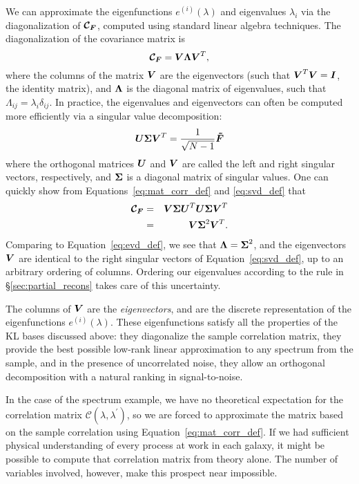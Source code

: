 We can approximate the eigenfunctions $e^{(i)}(\lambda)$ and
eigenvalues $\lambda_i$ via the diagonalization 
of $\boldsymbol{\mathcal{C}_F}$, computed using standard linear algebra techniques.
The diagonalization of the covariance matrix is
\begin{equation}
  \label{eq:evd_def}
  \boldsymbol{\mathcal{C}_F} = \boldsymbol{V}\boldsymbol{\Lambda}\boldsymbol{V}^T,
\end{equation}
where the columns of the matrix $\boldsymbol{V}$ are the eigenvectors
(such that $\boldsymbol{V}^T \boldsymbol{V} = \boldsymbol{I}$, the identity matrix), and
$\boldsymbol{\Lambda}$ is the diagonal matrix of eigenvalues, such that
$\Lambda_{ij} = \lambda_i\delta_{ij}$.  In practice, the eigenvalues and
eigenvectors can often be computed more efficiently via a singular value
decomposition:
\begin{equation}
  \label{eq:svd_def}
  \boldsymbol{U}\boldsymbol{\Sigma}\boldsymbol{V}^T
  = \frac{1}{\sqrt{N - 1}}\boldsymbol{\tilde{F}}
\end{equation}
where the orthogonal matrices $\boldsymbol{U}$ and $\boldsymbol{V}$ are called the
left and
right singular vectors, respectively, and $\boldsymbol{\Sigma}$ is a diagonal matrix
of singular values.  One can quickly show from Equations~\ref{eq:mat_corr_def}
and \ref{eq:svd_def} that
\begin{eqnarray}
  \boldsymbol{\mathcal{C}_F}
  &=& \boldsymbol{V}\boldsymbol{\Sigma}\boldsymbol{U}^T
  \boldsymbol{U}\boldsymbol{\Sigma}\boldsymbol{V}^T\nonumber\\
  &=& \boldsymbol{V}\boldsymbol{\Sigma}^2\boldsymbol{V}^T.
\end{eqnarray}
Comparing to Equation~\ref{eq:evd_def}, we see that 
$\boldsymbol{\Lambda} = \boldsymbol{\Sigma}^2$, and the eigenvectors $\boldsymbol{V}$ are
identical to the right singular vectors of Equation~\ref{eq:svd_def},
up to an arbitrary ordering of columns.  Ordering our eigenvalues
according to the rule in \S\ref{sec:partial_recons} takes care of
this uncertainty.

The columns of $\boldsymbol{V}$ are the {\it eigenvectors}, and are the discrete
representation of the eigenfunctions $e^{(i)}(\lambda)$.  These eigenfunctions
satisfy all the properties of the KL bases discussed above: they diagonalize
the sample correlation matrix, they provide the best possible low-rank
linear approximation to any spectrum from the sample, and in the presence of
uncorrelated noise, they allow an orthogonal decomposition with a natural
ranking in signal-to-noise.

In the case of the spectrum example, we have no theoretical expectation for the
correlation matrix $\mathcal{C}(\lambda, \lambda^\prime)$, so we are forced
to approximate the matrix based on the sample correlation using
Equation~\ref{eq:mat_corr_def}.  If we had sufficient physical understanding
of every process at work in each galaxy, it might be possible to compute
that correlation matrix from theory alone.  The number of variables involved,
however, make this prospect near impossible.

